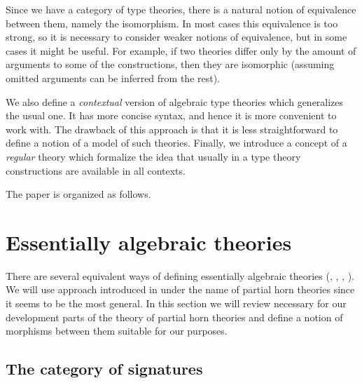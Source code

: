\documentclass{amsart}
\theoremstyle{definition}
\theoremstyle{remark}
\numberwithin{figure}{section}
\begin{document}
Since we have a category of type theories, there is a natural notion of equivalence between them, namely the isomorphism.
In most cases this equivalence is too strong, so it is necessary to consider weaker notions of equivalence, but in some cases it might be useful.
For example, if two theories differ only by the amount of arguments to some of the constructions,
then they are isomorphic (assuming omitted arguments can be inferred from the rest).

We also define a \emph{contextual} version of algebraic type theories which generalizes the usual one.
It has more concise syntax, and hence it is more convenient to work with.
The drawback of this approach is that it is less straightforward to define a notion of a model of such theories.
Finally, we introduce a concept of a \emph{regular} theory which formalize the idea that usually in a type theory constructions are available in all contexts.

The paper is organized as follows.

\begin{comment}
\section{Contextual categories}

Contextual categories were defined by Cartmell \cite{GAT}.
An equivalent definition was given by Voevodsky in \cite{c-systems}.
In this section we will give another equivalent definition which is just a description of models of the initial algebraic type theory as we will see later.
\end{comment}

\section{Essentially algebraic theories}

There are several equivalent ways of defining essentially algebraic theories (\cite{LPC}, \cite{GAT}, \cite{PHL}, \cite[D 1.3.4]{elephant}).
We will use approach introduced in \cite{PHL} under the name of partial horn theories since it seems to be the most general.
In this section we will review necessary for our development parts of the theory of partial horn theories and define a notion of morphisms between them suitable for our purposes.

\subsection{The category of signatures}
\end{document}
